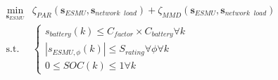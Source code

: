 \begin{equation}
\begin{split}
	\min_{\textbf{s}_{ESMU}} & \zeta_{PAR}(\textbf{s}_{ESMU}, \textbf{s}_{network\;\;load}) + \zeta_{MMD}(\textbf{s}_{ESMU}, \textbf{s}_{network\;\;load})\\
	\text{s.t. }& \begin{cases}
		s_{battery}(k) \leq C_{factor}\times C_{battery} \forall k\\
		\left|s_{ESMU,\phi}(k)\right| \leq S_{rating} \forall \phi \forall k\\
		0 \leq SOC(k) \leq 1 \forall k
	\end{cases}
\end{split}
\label{ch1:equ:scheduling-cost}
\end{equation}